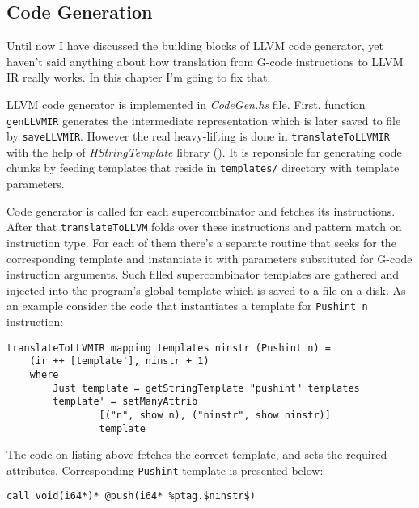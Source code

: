 \documentclass[12pt,a4paper]{report}
\begin{document}
\subsection{Code Generation}
Until now I have discussed the building blocks of LLVM code generator, yet
haven't said anything about how translation from G-code instructions to LLVM IR
really works. In this chapter I'm going to fix that.

LLVM code generator is implemented in \textit{CodeGen.hs} file. First, function
\texttt{genLLVMIR} generates the intermediate representation which is later
saved to file by \texttt{saveLLVMIR}. However the real heavy-lifting is done in
\texttt{translateToLLVMIR} with the help of \textit{HStringTemplate} library
(\cite{website:hstring_template}). It is reponsible for generating code chunks
by feeding templates that reside in \texttt{templates/} directory with template
parameters.

Code generator is called for each supercombinator and fetches its instructions.
After that \texttt{translateToLLVM} folds over these instructions and pattern
match on instruction type. For each of them there's a separate routine that
seeks for the corresponding template and instantiate it with parameters
substituted for G-code instruction arguments. Such filled supercombinator
templates are gathered and injected into the program's global template which is
saved to a file on a disk. As an example consider the code that instantiates a
template for \texttt{Pushint n} instruction:

\hspace*{-1.5in}
\begin{lstlisting}[style=haskell]
translateToLLVMIR mapping templates ninstr (Pushint n) =
    (ir ++ [template'], ninstr + 1)
    where
        Just template = getStringTemplate "pushint" templates
        template' = setManyAttrib
                [("n", show n), ("ninstr", show ninstr)]
                template
\end{lstlisting}

The code on listing above fetches the correct template, and sets the required
attributes. Corresponding \texttt{Pushint} template is presented below:

\hspace*{-1.5in}
\begin{lstlisting}[style=assembler]
%ptag.$ninstr$ = call i64*(i64)* @hAllocNum(i64 $n$)
call void(i64*)* @push(i64* %ptag.$ninstr$)
\end{lstlisting}
\end{document}

